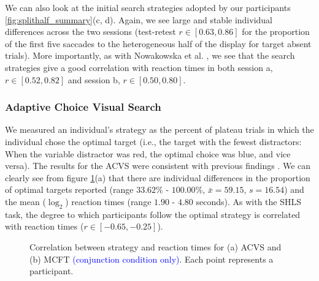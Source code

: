 \documentclass[Afour, sageapa, times]{sagej}
\begin{document}
We can also look at the initial search strategies adopted by our participants \ref{fig:splithalf_summary}(c, d). Again, we see large and stable individual differences across the two sessions (test-retest $r \in [0.63, 0.86]$ for the proportion of the first five saccades to the heterogeneous half of the display for target absent trials). More importantly, as with  Nowakowska et al. \citeyear{nowakowska2017}, we see that the search strategies give a good correlation with reaction times in both session a, $r \in [0.52, 0.82]$ and session b, $r \in [0.50, 0.80]$.

\subsubsection{Adaptive Choice Visual Search}
 
We measured an individual's strategy as the percent of plateau trials in which the individual chose the optimal target (i.e., the target with the fewest distractors: When the variable distractor was red, the optimal choice was blue, and vice versa). The results for the ACVS were consistent with previous findings  \cite{irons-leber2016,irons-leber2018}. We can clearly see from figure \ref{fig:acvs_mcft_summary}(a) that there are individual differences in the proportion of optimal targets reported (range $33.62\%$ - $100.00\%$, $\bar{x} = 59.15$, $s = 16.54$) and the mean ($\log_2$) reaction times (range $1.90$ - $4.80$ seconds). As with the SHLS task, the degree to which participants follow the optimal strategy is correlated with reaction times ($r \in [-0.65, -0.25]$).

\begin{figure}
\centering
{}
\caption{Correlation between strategy and reaction times for (a) ACVS and (b) MCFT \textcolor{blue}{(conjunction condition only)}. Each point represents a participant.}
\label{fig:acvs_mcft_summary}
\end{figure}
\end{document}
